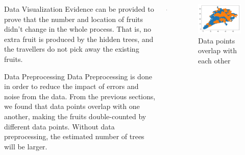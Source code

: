 \documentclass[final]{beamer}
\begin{document}
\begin{frame}
\begin{columns}[t]
\begin{column}{\colwidth}
\begin{tcolorbox}[width=\colwidth,height=\contentheight,top=.2in]
\begin{block}{Data Visualization}
Evidence can be provided to prove that the number and location of fruits didn't change in the whole process. That is, no extra fruit is produced by the hidden trees, and the travellers do not pick away the existing fruits.    

\end{block}

\vspace{.2in}

\begin{block}{Data Preprocessing}
Data Preprocessing is done in order to reduce the impact of errors and noise from the data. From the previous sections, we found that data points overlap with one another, making the fruits double-counted by different data points. Without data preprocessing, the estimated number of trees will be larger.

\end{block}

\end{tcolorbox}
\end{column}

\begin{column}{\marginwidth-\parsep}\end{column} %

\begin{column}{\colwidth} %
\begin{tcolorbox}[width=\colwidth,height=\contentheight,top=.2in]
\begin{block}{}


\begin{figure}[H]
\includegraphics[width=1.0\textwidth]{data_points_overlap}
\caption{Data points overlap with each other}
\end{figure}


\end{block}
\end{tcolorbox}
\end{column}
\end{columns}
\end{frame}
\end{document}
